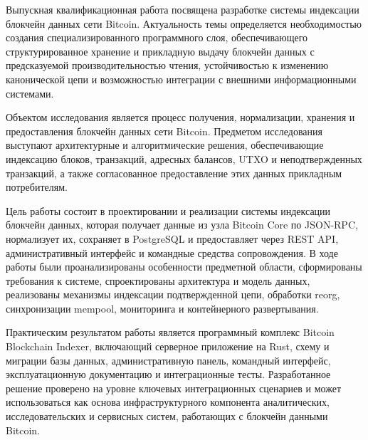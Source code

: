 ﻿\abstract %


Выпускная квалификационная работа посвящена разработке системы индексации
блокчейн данных сети Bitcoin. Актуальность темы определяется необходимостью
создания специализированного программного слоя, обеспечивающего
структурированное хранение и прикладную выдачу блокчейн данных с
предсказуемой производительностью чтения, устойчивостью к изменению
канонической цепи и возможностью интеграции с внешними информационными
системами.

Объектом исследования является процесс получения, нормализации, хранения и
предоставления блокчейн данных сети Bitcoin. Предметом исследования выступают
архитектурные и алгоритмические решения, обеспечивающие индексацию блоков,
транзакций, адресных балансов, UTXO и неподтвержденных транзакций, а также
согласованное предоставление этих данных прикладным потребителям.

Цель работы состоит в проектировании и реализации системы индексации
блокчейн данных, которая получает данные из узла Bitcoin Core по JSON-RPC,
нормализует их, сохраняет в PostgreSQL и предоставляет через REST API,
административный интерфейс и командные средства сопровождения. В ходе работы
были проанализированы особенности предметной области, сформированы требования
к системе, спроектированы архитектура и модель данных, реализованы механизмы
индексации подтвержденной цепи, обработки reorg, синхронизации mempool,
мониторинга и контейнерного развертывания.

Практическим результатом работы является программный комплекс
Bitcoin Blockchain Indexer, включающий серверное приложение на Rust,
схему и миграции базы данных, административную панель, командный интерфейс,
эксплуатационную документацию и интеграционные тесты. Разработанное решение
проверено на уровне ключевых интеграционных сценариев и может использоваться
как основа инфраструктурного компонента аналитических, исследовательских и
сервисных систем, работающих с блокчейн данными Bitcoin.
